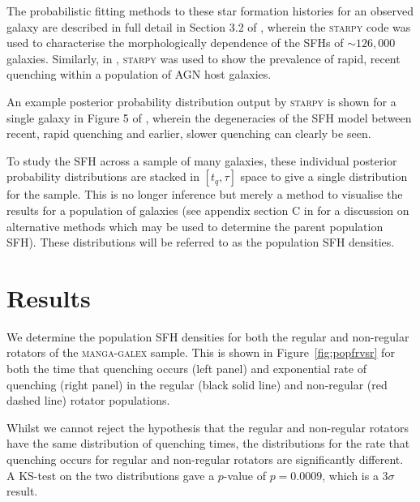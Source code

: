 \documentclass[useAMS,usenatbib]{mn2e}
\begin{document}
The probabilistic fitting methods to these star formation histories for an observed galaxy are described in full detail in Section 3.2 of \cite{smethurst15}, wherein the \textsc{starpy} code was used to characterise the morphologically dependence of the SFHs of $\sim126,000$ galaxies. Similarly, in \cite{smethurst16}, \textsc{starpy} was used to show the prevalence of rapid, recent quenching within a population of AGN host galaxies. 


An example posterior probability distribution output by \textsc{starpy} is shown for a single galaxy in Figure 5 of \cite{smethurst15}, wherein the degeneracies of the SFH model between recent, rapid quenching and earlier, slower quenching can clearly be seen. 

To study the SFH across a sample of many galaxies, these individual posterior probability distributions are stacked in $[t_q, \tau]$ space to give a single distribution for the sample. This is no longer inference but merely a method to visualise the results for a population of galaxies (see appendix section C in \citealt{smethurst16} for a discussion on alternative methods which may be used to determine the parent population SFH). These distributions will be referred to as the population SFH densities.

\section{Results}\label{sec:results}

We determine the population SFH densities for both the regular and non-regular rotators of the \textsc{manga-galex} sample. This is shown in Figure~\ref{fig:popfrvsr} for both the time that quenching occurs (left panel) and exponential rate of quenching (right panel) in the regular (black solid line) and non-regular (red dashed line) rotator populations. 

Whilst we cannot reject the hypothesis that the regular and non-regular rotators have the same distribution of quenching times, the distributions for the rate that quenching occurs for regular and non-regular rotators are significantly different. A KS-test on the two distributions gave a $p$-value of $p=0.0009$, which is a $3\sigma$ result.
\end{document}

